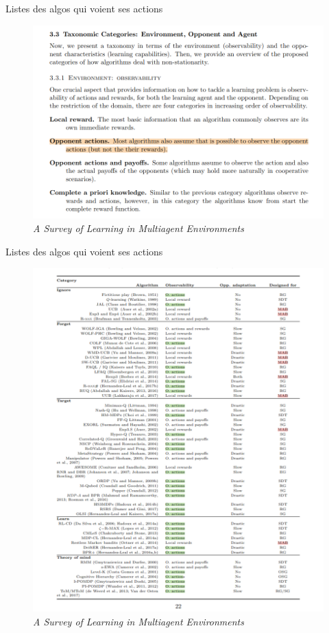 \documentclass[aspectratio=169,xcolor=dvipsnames]{beamer}
\begin{document}
\begin{frame}{Listes des algos qui voient ses actions}
  \begin{figure}
    \centering
    \includegraphics[scale=0.20]{actions_bac.png}
\caption{\citet{hernandez-leal_survey_2019-1} \textit{A Survey of Learning in Multiagent Environments}}
  \end{figure}
\end{frame}

\begin{frame}{Listes des algos qui voient ses actions}
  \begin{figure}
    \centering
    \includegraphics[scale=0.20]{Liste_algo_bac.png}
\caption{\citet{hernandez-leal_survey_2019-1} \textit{A Survey of Learning in Multiagent Environments}}
  \end{figure}
\end{frame}
\end{document}
